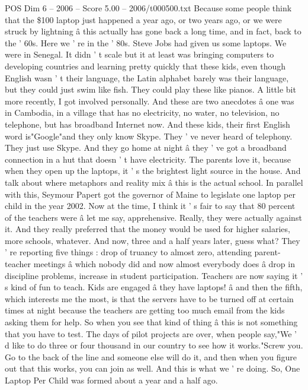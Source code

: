 \begin{textsample}{POS Dim 6 – 2006 – Score 5.00 – 2006/t000500.txt}
Because some people think that the \$100 laptop just happened a year ago, or two years ago, or we were struck by lightning â this actually has gone back a long time, and in fact, back to the ' 60s.
Here we ' re in the ' 80s.
Steve Jobs had given us some laptops.
We were in Senegal.
It didn ' t scale but it at least was bringing computers to developing countries and learning pretty quickly that these kids, even though English wasn ' t their language, the Latin alphabet barely was their language, but they could just swim like fish.
They could play these like pianos.
A little bit more recently, I got involved personally.
And these are two anecdotes â one was in Cambodia, in a village that has no electricity, no water, no television, no telephone, but has broadband Internet now.
And these kids, their first English word is"Google"and they only know Skype.
They ' ve never heard of telephony.
They just use Skype.
And they go home at night â they ' ve got a broadband connection in a hut that doesn ' t have electricity.
The parents love it, because when they open up the laptops, it ' s the brightest light source in the house.
And talk about where metaphors and reality mix â this is the actual school.
In parallel with this, Seymour Papert got the governor of Maine to legislate one laptop per child in the year 2002.
Now at the time, I think it ' s fair to say that 80 percent of the teachers were â let me say, apprehensive.
Really, they were actually against it.
And they really preferred that the money would be used for higher salaries, more schools, whatever.
And now, three and a half years later, guess what?
They ' re reporting five things : drop of truancy to almost zero, attending parent-teacher meetings â which nobody did and now almost everybody does â drop in discipline problems, increase in student participation.
Teachers are now saying it ' s kind of fun to teach.
Kids are engaged â they have laptops! â and then the fifth, which interests me the most, is that the servers have to be turned off at certain times at night because the teachers are getting too much email from the kids asking them for help.
So when you see that kind of thing â this is not something that you have to test.
The days of pilot projects are over, when people say,"We ' d like to do three or four thousand in our country to see how it works."Screw you.
Go to the back of the line and someone else will do it, and then when you figure out that this works, you can join as well.
And this is what we ' re doing.
So, One Laptop Per Child was formed about a year and a half ago.

\end{textsample}
